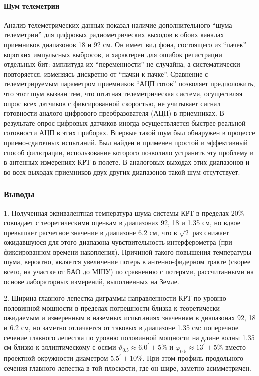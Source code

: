 \paragraph{Шум телеметрии}

Анализ телеметрических данных показал наличие дополнительного
``шума телеметрии'' для цифровых радиометрических выходов в обоих каналах
приемников диапазонов 18 и 92 см.
Он имеет вид фона, состоящего из ``пачек'' коротких импульсных
выбросов, и характерен для ошибок регистрации отдельных бит: амплитуда их
``переменности'' не случайна, а систематически повторяется, изменяясь дискретно
от ``пачки к пачке''. Сравнение с телеметрируемым параметром приемников ``АЦП готов''
позволяет предположить, что этот шум вызван тем, что штатная телеметрическая система,
осуществляя опрос всех датчиков с фиксированной скоростью, не учитывает сигнал
готовности аналого-цифрового преобразователя (АЦП) в приемниках.
В результате опрос цифровых датчиков иногда осуществляется быстрее
реальной готовности АЦП в этих приборах. Впервые такой шум был обнаружен в
процессе приемо-сдаточных испытаний. Был найден и применен простой и эффективный
способ фильтрации, использование которого позволило устранить эту проблему
и в антенных измерениях КРТ в полете. В аналоговых выходах этих диапазонов
и во всех выходах приемников двух других диапазонов такой шум отсутствует.


\subsubsection{Выводы}

1. Полученная эквивалентная температура шума системы КРТ в пределах 20\%
совпадает с теоретическими оценкам в диапазонах 92, 18 и 1.35 см,
но вдвое превышает расчетное значение в диапазоне 6.2 см, что
в $\sqrt 2$ раз снижает ожидавшуюся для этого диапазона
чувствительность интерферометра (при фиксированном времени накопления).
Причиной такого повышения температуры шума, вероятно, является увеличение потерь в
антенно-фидерном тракте (скорее всего, на участке от БАО до МШУ) по сравнению с
потерями, рассчитанными на основе лабораторных измерений, выполненных на Земле.


2. Ширина главного лепестка диграммы направленности КРТ по уровню половинной мощности
в пределах погрешности близка к теоретически ожидаемым
и измеренным в наземных испытаниях значениям в
диапазонах 92, 18 и 6.2 см,
но заметно отличается от таковых в диапазоне 1.35 см:
поперечное сечение главного лепестка по уровню половинной мощности
на длине волны 1.35 см близко к эллиптическому с осями
$\vartheta_{0.5} \approx 6.0^\prime \pm 5\%$ и
$\varphi_{0.5} \approx 13 ^\prime  \pm 5\%$
 вместо проектной окружности диаметром $5.5 ^\prime  \pm 10\%$.
При этом профиль продольного сечения главного лепестка в той плоскости,
где он шире, заметно асимметричен.

